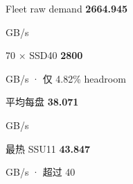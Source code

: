 \documentclass[UTF8,fontset=none,10pt,a4paper]{ctexart}
\begin{document}
\begin{minipage}[t]{.23\textwidth}
\begin{kpicard}{Fleet raw demand}
{\sffamily\bfseries\color{Navy}\LARGE 2664.945}\par
{\small GB/s}
\end{kpicard}
\end{minipage}\hfill
\begin{minipage}[t]{.23\textwidth}
\begin{kpicard}{70 × SSD40}
{\sffamily\bfseries\color{Navy}\LARGE 2800}\par
{\small GB/s · 仅 4.82\% headroom}
\end{kpicard}
\end{minipage}\hfill
\begin{minipage}[t]{.23\textwidth}
\begin{kpicard}{平均每盘}
{\sffamily\bfseries\color{Blue}\LARGE 38.071}\par
{\small GB/s}
\end{kpicard}
\end{minipage}\hfill
\begin{minipage}[t]{.23\textwidth}
\begin{kpicard}{最热 SSU11}
{\sffamily\bfseries\color{Red}\LARGE 43.847}\par
{\small GB/s · 超过 40}
\end{kpicard}
\end{minipage}
\end{document}
